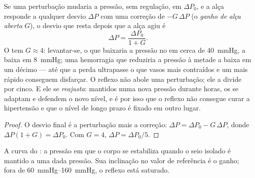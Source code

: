 \begin{theorem}\label{thm:b2:blood-pressure:gain}
Se uma perturbação mudaria a pressão, sem regulação, em $\Delta P_0$, e
a alça responde a qualquer desvio $\Delta P$ com uma correção de
$-G\,\Delta P$ (o \emph{ganho de alça aberta} $G$), o desvio que resta
depois que a alça agiu é
\[
\Delta P = \frac{\Delta P_0}{1 + G}.
\]
O  tem $G \approx 4$: levantar-se, o que baixaria a pressão
no  em cerca de \qty{40}{mmHg}, a baixa em \qty{8}{mmHg}; uma
hemorragia que reduziria a pressão à metade a baixa em um décimo --- até
que a perda ultrapasse o que vasos mais contraídos e um  mais
rápido conseguem disfarçar. O reflexo não abole uma perturbação; ele a
divide por cinco. E ele se \emph{reajusta}: mantidos numa nova pressão
durante horas, os  se adaptam e defendem o novo nível, e
é por isso que o reflexo não consegue curar a hipertensão e que o nível
de longo prazo é fixado em outro lugar.
\end{theorem}
\begin{proof}
O desvio final é a perturbação mais a correção:
$\Delta P = \Delta P_0 - G\,\Delta P$, donde $\Delta P(1 + G) =
\Delta P_0$. Com $G = 4$, $\Delta P = \Delta P_0/5$.
\end{proof}

\begin{omfigure}

{\small A curva do : a pressão em que o corpo se estabiliza
quando o seio isolado é mantido a uma dada pressão. Sua inclinação no
valor de referência é o ganho; fora de \qtyrange{60}{160}{mmHg}, o
reflexo está saturado.}
\end{omfigure}

